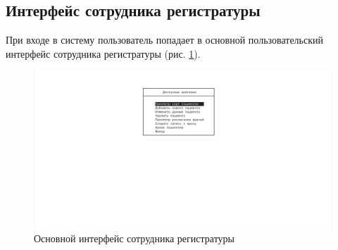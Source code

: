 \documentclass[14pt,a4paper,russian]{extreport}
\begin{document}
\subsection{Интерфейс сотрудника регистратуры}
При входе в систему пользователь попадает в основной пользовательский интерфейс сотрудника регистратуры (рис. \ref{fig:registry-interface}).\par
\begin{figure}[h!]
        \includegraphics[width=\textwidth]{prog_int/registry-interface}
        \caption{Основной интерфейс сотрудника регистратуры}
        \label{fig:registry-interface}
\end{figure}
\end{document}
